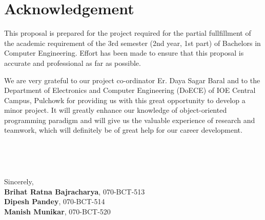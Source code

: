 \section*{Acknowledgement}

This proposal is prepared for the project required for the partial fullfillment
of the academic requirement of the 3rd semester (2nd year, 1st part) of
Bachelors in Computer Engineering. Effort has been made to ensure that this
proposal is accurate and professional as far as possible.

We are very grateful to our project co-ordinator Er. Daya Sagar Baral and to
the Department of Electronics and Computer Engineering (DoECE) of IOE Central
Campus, Pulchowk for providing us with this great opportunity to develop a
minor project. It will greatly enhance our knowledge of object-oriented
programming paradigm and will give us the valuable experience of research and
teamwork, which will definitely be of great help for our career development.

~

~

Sincerely,\\
\textbf{Brihat Ratna Bajracharya}, 070-BCT-513\\
\textbf{Dipesh Pandey}, 070-BCT-514\\
\textbf{Manish Munikar}, 070-BCT-520
